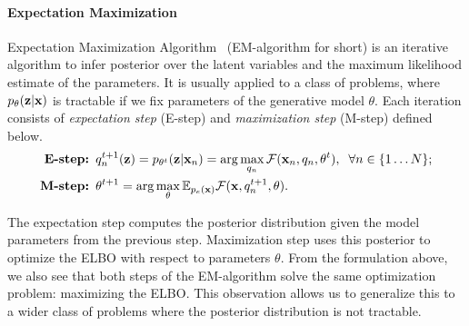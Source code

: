 \paragraph{Expectation Maximization}
Expectation Maximization Algorithm~\citep{dempster1977maximum} (EM-algorithm for short) is an iterative algorithm to infer posterior over the latent variables and the maximum likelihood estimate of the parameters.
It is usually applied to a class of problems, where $p_{\theta}({\mathbf{z}}|{\mathbf{x}})$ is tractable if we fix parameters of the generative model $\theta$. Each iteration consists of \textit{expectation step} (E-step) and \textit{maximization step} (M-step) defined below.
\begin{equation}
\begin{aligned}
    \text{\textbf{E-step:  }} &q^{t+1}_n({\mathbf{z}}) = p_{\theta^t}({\mathbf{z}}|{\mathbf{x}}_n) = \arg\max_{q_n} \mathcal{F}({\mathbf{x}}_n, q_n, \theta^t),\;\;\forall n \in \{1\dots N\};\\
    \text{\textbf{M-step:  }} &\theta^{t+1} = \arg\max_{\theta} \mathbb{E}_{p_e({\mathbf{x}})}\mathcal{F}({\mathbf{x}}, q^{t+1}_n, \theta).\\
\end{aligned}
\end{equation}

The expectation step computes the posterior distribution given the model parameters from the previous step. Maximization step uses this posterior to optimize the ELBO with respect to parameters $\theta$. From the formulation above, we also see that both steps of the EM-algorithm solve the same optimization problem: maximizing the ELBO.  This observation allows us to generalize this to a wider class of problems where the posterior distribution is not tractable. 

